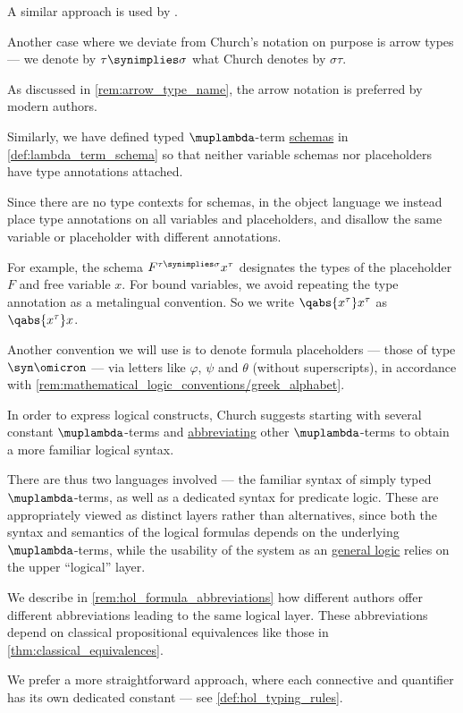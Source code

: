 \begin{remark}
\begin{thmenum}
    A similar approach is used by \textcite[def. 2A7]{Hindley1997BasicSTT}.

     Another case where we deviate from Church's notation on purpose is arrow types --- we denote by \( \tau \synimplies \sigma \) what Church denotes by \( \sigma\tau \).

    As discussed in \cref{rem:arrow_type_name}, the arrow notation is preferred by modern authors.

     Similarly, we have defined typed \( \muplambda \)-term \hyperref[con:schemas_and_instances]{schemas} in \cref{def:lambda_term_schema} so that neither variable schemas nor placeholders have type annotations attached.

    Since there are no type contexts for schemas, in the object language we instead place type annotations on all variables and placeholders, and disallow the same variable or placeholder with different annotations.

    For example, the schema \( F^{\tau \synimplies \sigma} x^\tau \) designates the types of the placeholder \( F \) and free variable \( x \). For bound variables, we avoid repeating the type annotation as a metalingual convention. So we write \( \qabs {x^\tau} x^\tau \) as \( \qabs {x^\tau} x \).

    Another convention we will use is to denote formula placeholders --- those of type \( \syn\omicron \) --- via letters like \( \varphi \), \( \psi \) and \( \theta \) (without superscripts), in accordance with \cref{rem:mathematical_logic_conventions/greek_alphabet}.

     In order to express logical constructs, Church suggests starting with several constant \( \muplambda \)-terms and \hyperref[con:syntactic_abbreviation]{abbreviating} other \( \muplambda \)-terms to obtain a more familiar logical syntax.

    There are thus two languages involved --- the familiar syntax of simply typed \( \muplambda \)-terms, as well as a dedicated syntax for predicate logic. These are appropriately viewed as distinct layers rather than alternatives, since both the syntax and semantics of the logical formulas depends on the underlying \( \muplambda \)-terms, while the usability of the system as an \hyperref[def:general_logic]{general logic} relies on the upper \enquote{logical} layer.

    We describe in \cref{rem:hol_formula_abbreviations} how different authors offer different abbreviations leading to the same logical layer. These abbreviations depend on classical propositional equivalences like those in \cref{thm:classical_equivalences}.

    We prefer a more straightforward approach, where each connective and quantifier has its own dedicated constant --- see \cref{def:hol_typing_rules}.
  \end{thmenum}
\end{remark}

